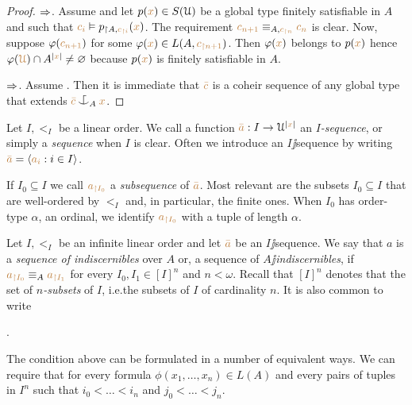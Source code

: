 \documentclass[creche.tex]{subfiles}
\begin{document}
\begin{proof}
$\Rightarrow$.
Assume  and let $p({\color{brown} x})\in S(\EuScript U)$ be a global type finitely satisfiable in $A$ and such that ${\color{brown} c_i}\vDash p_{\restriction A,{\color{brown} c_{\restriction i}}}({\color{brown} x})$.
The requirement ${\color{brown} c_{n+1}}\equiv_{A,{\color{brown} c_{\restriction n}}} {\color{brown} c_n}$ is clear.
Now, suppose $\varphi({\color{brown} c_{n+1}})$ for some $\varphi({\color{brown} x})\in L(A,{\color{brown} c_{\restriction n+1}})$.
Then $\varphi({\color{brown} x})$ belongs to $p({\color{brown} x})$ hence $\varphi({\color{brown}\EuScript U})\cap A^{|{\color{brown} x}|}\neq\varnothing$ because $p({\color{brown} x})$ is finitely satisfiable in $A$.

$\Rightarrow$.
Assume .
Then it is immediate that ${\color{brown}\bar c}$ is a coheir sequence of any global type that extends ${\mr\bar c}\nonforkc_A{\mr x}$.
\end{proof}

Let $I,<_I$ be a linear order.
We call a function ${\color{brown}\bar a}:I\to\EuScript U^{|{\color{brown} x}|}$ an \emph{$I$-sequence}, or simply a \emph{sequence\/} when $I$ is clear.
Often we introduce an $I\jj$sequence by writing ${\color{brown}\bar a}=\langle{\color{brown}a_i}: i\in I\rangle$.


If $I_0\subseteq I$ we call ${\color{brown} a_{\restriction I_0}}$ a \emph{subsequence\/} of ${\color{brown}\bar a}$.
Most relevant are the subsets $I_0\subseteq I$ that are well-ordered by $<_I$ and, in particular, the finite ones.
When $I_0$ has order-type $\alpha$, an ordinal, we identify ${\color{brown} a_{\restriction I_0}}$ with a tuple of length $\alpha$.
 
\begin{definition}
Let $I,<_I$ be an infinite linear order and let ${\color{brown}\bar a}$ be an $I\jj$sequence.
We say that $a$ is a \emph{sequence of indiscernibles\/} over $A$ or, a sequence of \emph{$A\jj$indiscernibles}, if ${\color{brown} a_{\restriction I_0}}\equiv_A {\color{brown} a_{\restriction I_1}}$ for every $I_0,I_1\in [I]^n$ and $n<\omega$.
Recall that \emph{$[I]^n$} denotes that the set of \emph{$n$-subsets\/} of $I$,  i.e.\@ the subsets of $I$ of cardinality $n$.
It is also common to write\smallskip

.\QED
\end{definition}

The condition above can be formulated in a number of equivalent ways.
We can require that for every formula $\phi(x_1,\dots,x_n)\in L(A)$ and every pairs of tuples in $I^n$ such that $i_0<\dots<i_n$ and $j_0<\dots<j_n$.


\end{document}
